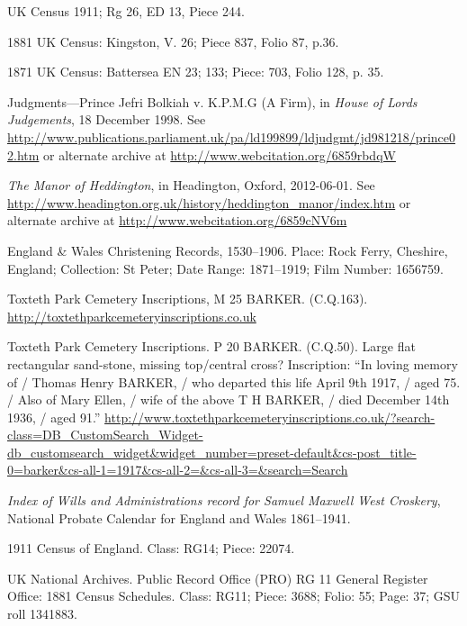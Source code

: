 \begin{thebibliography}{99}
	UK Census 1911; Rg 26, ED 13, Piece 244.

	1881 UK Census: Kingston, V. 26; Piece 837, Folio 87, p.36.

	1871 UK Census: Battersea EN 23; 133; Piece: 703, Folio 128, p. 35.

	Judgments---Prince Jefri Bolkiah v. K.P.M.G (A Firm), in \emph{House of Lords Judgements}, 18 December 1998.
	See \url{http://www.publications.parliament.uk/pa/ld199899/ldjudgmt/jd981218/prince02.htm}
	or alternate archive at \url{http://www.webcitation.org/6859rbdqW}

	\emph{The Manor of Heddington}, in Headington, Oxford, 2012-06-01.
	See \url{http://www.headington.org.uk/history/heddington_manor/index.htm} or alternate archive at \url{http://www.webcitation.org/6859cNV6m}

	England \& Wales Christening Records, 1530--1906.
	Place: Rock Ferry, Cheshire, England; Collection: St Peter; Date Range: 1871--1919; Film Number: 1656759.

	Toxteth Park Cemetery Inscriptions, M 25 BARKER. (C.Q.163). \url{http://toxtethparkcemeteryinscriptions.co.uk}

	Toxteth Park Cemetery Inscriptions. P 20 BARKER. (C.Q.50).
	Large flat rectangular sand-stone, missing top/central cross? Inscription:
	``In loving memory of / Thomas Henry BARKER, / who departed this life April 9th 1917, / aged 75. /
	Also of Mary Ellen, / wife of the above T H BARKER, / died December 14th 1936, / aged 91.''
	\url{http://www.toxtethparkcemeteryinscriptions.co.uk/?search-class=DB_CustomSearch_Widget-db_customsearch_widget&widget_number=preset-default&cs-post_title-0=barker&cs-all-1=1917&cs-all-2=&cs-all-3=&search=Search}

	\emph{Index of Wills and Administrations record for Samuel Maxwell West Croskery},
	National Probate Calendar for England and Wales 1861--1941.

	1911 Census of England. Class: RG14; Piece: 22074.

	UK National Archives. Public Record Office (PRO) RG 11 General Register Office: 1881 Census Schedules.
	Class: RG11; Piece: 3688; Folio: 55; Page: 37; GSU roll 1341883.


\end{thebibliography}
